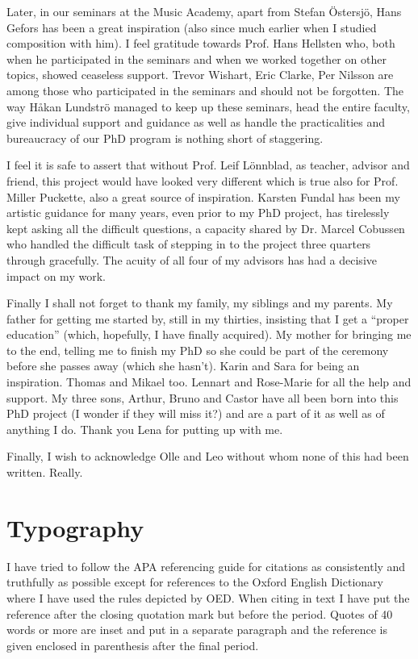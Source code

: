 Later, in our seminars at the Music Academy, apart from Stefan \"{O}stersj\"{o}, Hans Gefors has been a great inspiration (also since much earlier when I studied composition with him). I feel gratitude towards Prof. Hans Hellsten who, both when he participated in the seminars and when we worked together on other topics, showed ceaseless support. Trevor Wishart, Eric Clarke, Per Nilsson are among those who participated in the seminars and should not be forgotten. The way H{\aa}kan Lundstr\"{o} managed to keep up these seminars, head the entire faculty, give individual support and guidance as well as handle the practicalities and bureaucracy of our PhD program is nothing short of staggering.

I feel it is safe to assert that without Prof. Leif L\"{o}nnblad, as teacher, advisor and friend, this project would have looked very different which is true also for Prof. Miller Puckette, also a great source of inspiration. Karsten Fundal has been my artistic guidance for many years, even prior to my PhD project, has tirelessly kept asking all the difficult questions, a capacity shared by Dr. Marcel Cobussen who handled the difficult task of stepping in to the project three quarters through gracefully. The acuity of all four of my advisors has had a decisive impact on my work.

Finally I shall not forget to thank my family, my siblings and my parents. My father for getting me started by, still in my thirties, insisting that I get a ``proper education'' (which, hopefully, I have finally acquired). My mother for bringing me to the end, telling me to finish my PhD so she could be part of the ceremony before she passes away (which she hasn't). Karin and Sara for being an inspiration. Thomas and Mikael too. Lennart and Rose-Marie for all the help and support. My three sons, Arthur, Bruno and Castor have all been born into this PhD project (I wonder if they will miss it?) and are a part of it as well as of anything I do. Thank you Lena for putting up with me.

Finally, I wish to acknowledge Olle and Leo without whom none of this had been written. Really.


\section{Typography}
\label{sec:typography}

I have tried to follow the APA referencing guide for citations as
consistently and truthfully as possible except for references to the
Oxford English Dictionary where I have used the rules depicted by OED.
When citing in text I have put the reference after the closing
quotation mark but before the period. Quotes of 40 words or more are
inset and put in a separate paragraph and the reference is given
enclosed in parenthesis after the final period.

